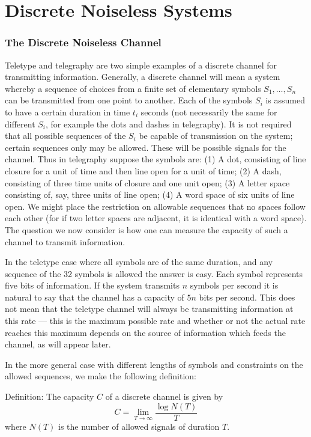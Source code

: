 \part{Discrete Noiseless Systems}

\section{The Discrete Noiseless Channel}
\label{sec:1}

Teletype and telegraphy are two simple examples of a discrete channel
for transmitting information.  Generally, a discrete channel will mean
a system whereby a sequence of choices from a finite set of elementary
symbols $S_1,\dots,S_n$ can be transmitted from one point to another.
Each of the symbols $S_i$ is assumed to have a certain duration in
time $t_i$ seconds (not necessarily the same for different $S_i$, for
example the dots and dashes in telegraphy).  It is not required that
all possible sequences of the $S_i$ be capable of transmission on the
system; certain sequences only may be allowed.  These will be possible
signals for the channel.  Thus in telegraphy suppose the symbols are:
(1) A dot, consisting of line closure for a unit of time and then line
open for a unit of time; (2) A dash, consisting of three time units
of closure and one unit open; (3) A letter space consisting of, say,
three units of line open; (4) A word space of six units of line open.
We might place the restriction on allowable sequences that no spaces
follow each other (for if two letter spaces are adjacent, it is
identical with a word space).  The question we now consider is how one
can measure the capacity of such a channel to transmit information.

In the teletype case where all symbols are of the same duration, and any
sequence of the 32 symbols is allowed the answer is easy.  Each symbol
represents five bits of information.  If the system transmits $n$ symbols
per second it is natural to say that the channel has a capacity of $5n$
bits per second.  This does not mean that the teletype channel will always
be transmitting information at this rate --- this is the maximum possible
rate and whether or not the actual rate reaches this maximum depends on
the source of information which feeds the channel, as will appear later.

In the more general case with different lengths of symbols and constraints
on the allowed sequences, we make the following definition:
\par\noindent Definition:
The capacity $C$ of a discrete channel is given by
$$
C = \lim_{T\to\infty} \frac{\log N(T)}{T}
$$
where $N(T)$ is the number of allowed signals of duration $T$.

